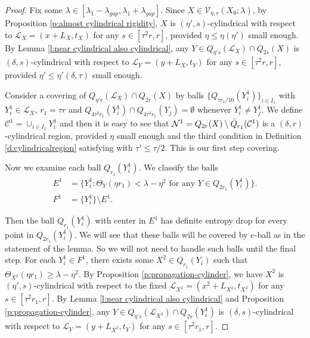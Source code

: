 \documentclass[11pt,reqno]{amsart}
\numberwithin{equation}{section}
\newcommand{\cC}{\mathcal{C}}
\newcommand{\cL}{\mathcal{L}}
\newcommand{\cN}{\mathcal{N}}
\newcommand{\cV}{\mathcal{V}}
\theoremstyle{definition}
\theoremstyle{remark}
\theoremstyle{remark}
\theoremstyle{remark}
\theoremstyle{remark}\newtheorem{conjecture}[equation]{Conjecture}
\theoremstyle{remark}\newtheorem{question}[equation]{Question}
\begin{document}
\begin{proof}
    Fix some $\lambda \in [\lambda_1 -\lambda_{gap}, \lambda_1 + \lambda_{gap}]$. Since $X \in \cV_{\eta,r}(X_0;\lambda)$, by Proposition \ref{p:almost cylindrical rigidity}, $X$ is $(\eta',s)$-cylindrical with respect to $\cL_{X}= (x+L_X, t_X)$ for any $s \in [\tau^2 r,r]$, provided $\eta\le \eta(\eta')$ small enough. By Lemma \ref{l:near cylindrical also cylindrical}, any $Y \in Q_{\eta' s}(\cL_{X}) \cap Q_{2s}(X)$ is $(\delta, s)$-cylindrical with respect to $\cL_Y = (y+L_X, t_Y)$ for any $s \in [\tau^2 r, r]$, provided $\eta'\le \eta'(\delta,\tau)$ small enough.
    
    Consider a covering of $Q_{\eta' r}(\cL_X) \cap Q_{2r}(X)$ by balls $\{Q_{\tau r_1/10}(Y^1_i)\}_{i \in I_1}$ with $Y^1_i \in \cL_X$, $r_1=\tau r$ and $Q_{4\tau^2 r_1}(Y^1_i) \cap Q_{ 4\tau^2 r_1}(Y_j) = \emptyset$ whenever $Y^1_i \neq Y^1_j$. We define $\cC^1 = \cup_{i\in I_1} Y^1_i$ and then it is easy to see that $\cN^1 = Q_{2r}(X) \setminus \Bar{Q}_{r_1}(\cC^1)$ is a $(\delta,r)$-cylindrical region, provided $\eta$ small enough and the third condition in Definition \ref{d:cylindricalregion} satisfying with $\tau'\le \tau/2$. This is our first step covering. 
    
    Now we examine each ball $Q_{r_1}(Y^1_i)$. We classify the balls 
    \begin{equation*}
    \begin{split}
        E^1 &= \{ Y^1_i : \Theta_Y(\eta r_1) < \lambda - \eta^2 \text{ for any } Y \in Q_{2r_1}(Y^1_i) \}. \\
        F^1 &= \{Y^1_i\} \setminus E^1.
    \end{split}
    \end{equation*}
    
Then the ball $Q_{r_1}(Y_i^1)$ with center in $E^1$ has definite entropy drop for every point in $Q_{2r_1}(Y_i^1)$. We will see that these balls will be covered by $e$-ball as in the statement of the lemma. So we will not need to handle such balls until the final step. 
For each $Y^1_i \in F^1$, there exists some $X^2 \in Q_{r_1}(Y_i)$ such that $\Theta_{X^2}(\eta r_1) \ge \lambda -\eta^2$. By Proposition \ref{p:propagation-cylinder}, we have $X^2$ is $(\eta',s)$-cylindrical with respect to the fixed $\cL_{X^2} = (x^2 + L_{X^2}, t_{X^2})$ for any $s \in [\tau^2 r_1, r]$. By Lemma \ref{l:near cylindrical also cylindrical} and Proposition \ref{p:propagation-cylinder}, any $Y \in Q_{\eta' s}(\cL_{X^2})\cap Q_{2s}(Y^1_i)$ is $(\delta,s)$-cylindrical with respect to $\cL_Y = (y + L_{X^2}, t_Y)$ for any $s\in[\tau^2 r_1, r]$.
    

\end{proof}
\end{document}
